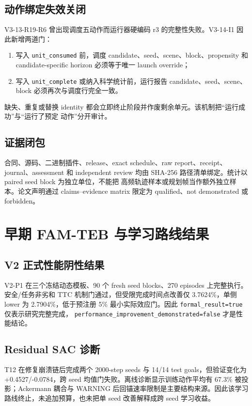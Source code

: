 \documentclass[12pt,a4paper,oneside]{report}
\newcommand{\code}[1]{\texttt{#1}}
\begin{document}
\section{动作绑定失效关闭}
V3-13-R19-R6 曾出现调度五动作而运行器硬编码 r3 的完整性失败。V3-14-I1 因此新增两道门：
\begin{enumerate}
  \item 写入 \code{unit\_consumed} 前，调度 candidate、seed、scene、block、propensity 和
  candidate-specific horizon 必须等于唯一 launch override；
  \item 写入 \code{unit\_complete} 或纳入科学统计前，运行报告 candidate、seed、scene、block
  必须再次与调度行完全一致。
\end{enumerate}
缺失、重复或替换 identity 都会立即终止阶段并作废剩余单元。该机制把“运行成功”与“运行了预定
动作”分开审计。

\section{证据闭包}
合同、源码、二进制插件、release、exact schedule、raw report、receipt、journal、assessment 和
independent review 均由 SHA-256 路径清单绑定。统计以 paired seed block 为独立单位，不能把
高频轨迹样本或规划帧当作额外独立样本。论文声明通过 claims--evidence matrix 限定为
qualified、not demonstrated 或 forbidden。

\chapter{早期 FAM-TEB 与学习路线结果}
\section{V2 正式性能阴性结果}
V2-P1 在三个冻结动态模板、90 个 fresh seed blocks、270 episodes 上完整执行。安全/任务非劣和
TTC 机制门通过，但受限完成时间点改善仅 3.7624\%，单侧 lower 为 2.7904\%，低于预注册 5\%
最小实际效应门。因此 \code{formal\_result=true} 仅表示研究完整完成，
\code{performance\_improvement\_demonstrated=false} 才是性能结论。

\section{Residual SAC 诊断}
T12 在修复崩溃链后完成两个 2000-step seeds 与 14/14 test goals，但验证变化为
+0.4527/-0.0784，跨 seed 均值门失败。离线诊断显示训练动作平均有 67.3\% 被投影；Ackermann
耦合与 WARNING 后回锚速率限制是主要结构来源。因此该学习路线终止，未追加预算，也未把单 seed
改善解释成跨 seed 学习收益。
\end{document}
